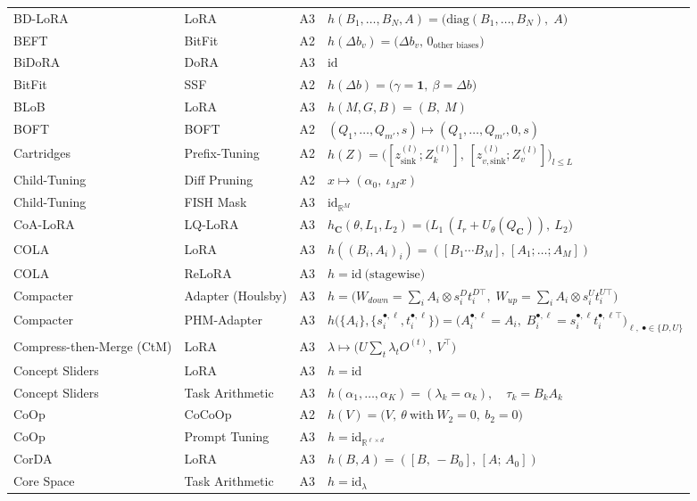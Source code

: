 \begin{longtable}{@{}>{\raggedright\arraybackslash}p{2.4cm}>{\raggedright\arraybackslash}p{2.4cm}c>{\raggedright\arraybackslash}p{8.6cm}@{}}
BD-LoRA & LoRA & A3 & $h(B_1,\dots,B_N,A)=\big(\mathrm{diag}(B_1,\dots,B_N),\;A\big)$\\
BEFT & BitFit & A2 & $h(\Delta b_v)=\big(\Delta b_v,\,0_{\text{other biases}}\big)$\\
BiDoRA & DoRA & A3 & $\mathrm{id}$\\
BitFit & SSF & A2 & $h(\Delta b)=\big(\gamma=\mathbf 1,\ \beta=\Delta b\big)$\\
BLoB & LoRA & A3 & $h(M,G,B)=(B,\ M)$\\
BOFT & BOFT & A2 & $(Q_1,\dots,Q_{m'},s)\mapsto(Q_1,\dots,Q_{m'},0,s)$\\
Cartridges & Prefix-Tuning & A2 & $h(Z)=\big([z^{(l)}_{\mathrm{sink}};Z_k^{(l)}],\,[z^{(l)}_{v,\mathrm{sink}};Z_v^{(l)}]\big)_{l\le L}$\\
Child-Tuning & Diff Pruning & A2 & $x\mapsto(\alpha_0,\ \iota_M x)$\\
Child-Tuning & FISH Mask & A3 & $\mathrm{id}_{\mathbb R^M}$\\
CoA-LoRA & LQ-LoRA & A3 & $h_{\mathbf C}(\theta,L_1,L_2)=\big(L_1\,(I_r+U_\theta(Q_{\mathbf C})),\ L_2\big)$\\
COLA & LoRA & A3 & $h((B_i,A_i)_i)=([B_1\cdots B_M],\,[A_1;\dots;A_M])$\\
COLA & ReLoRA & A3 & $h=\mathrm{id}\ \text{(stagewise)}$\\
Compacter & Adapter (Houlsby) & A3 & $h=\big(W_{down}=\textstyle\sum_iA_i\otimes s_i^Dt_i^{D\top},\;W_{up}=\sum_iA_i\otimes s_i^Ut_i^{U\top}\big)$\\
Compacter & PHM-Adapter & A3 & $h\big(\{A_i\},\{s_i^{\bullet,\ell},t_i^{\bullet,\ell}\}\big)=\big(A_i^{\bullet,\ell}=A_i,\;B_i^{\bullet,\ell}=s_i^{\bullet,\ell}t_i^{\bullet,\ell\top}\big)_{\ell,\ \bullet\in\{D,U\}}$\\
Compress-then-Merge (CtM) & LoRA & A3 & $\lambda\mapsto\big(U\textstyle\sum_t\lambda_tO^{(t)},\ V^\top\big)$\\
Concept Sliders & LoRA & A3 & $h=\mathrm{id}$\\
Concept Sliders & Task Arithmetic & A3 & $h(\alpha_1,\dots,\alpha_K)=(\lambda_k=\alpha_k),\quad \tau_k=B_kA_k$\\
CoOp & CoCoOp & A2 & $h(V)=\big(V,\ \theta\ \text{with}\ W_2=0,\ b_2=0\big)$\\
CoOp & Prompt Tuning & A3 & $h=\mathrm{id}_{\mathbb R^{\ell\times d}}$\\
CorDA & LoRA & A3 & $h(B,A)=([B,\,-B_0],\,[A;\,A_0])$\\
Core Space & Task Arithmetic & A3 & $h=\mathrm{id}_\lambda$\\

\end{longtable}

